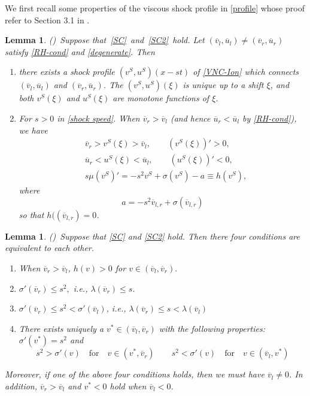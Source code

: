 \documentclass[12pt,reqno]{amsart}
\numberwithin{equation}{section}
\newtheorem{lemma}[theorem]{Lemma}
\begin{document}
We first recall some properties of the viscous shock profile in \eqref{profile} whose proof refer to  Section 3.1 in \cite{InitialModel}.
\begin{lemma}\label{unique}
	(\cite{InitialModel})~Suppose that~\eqref{SC}~and~\eqref{SC2}~hold. Let $(\overline{v}_l,\overline{u}_l)\neq (\overline{v}_r,\overline{u}_r)$ satisfy \eqref{RH-cond} and \eqref{degenerate}. Then
	\begin{enumerate}
		\item[(i)] there exists a shock profile $(v^S,u^S)(x-st)$ of \eqref{VNC-Ion}
		which connects  $(\overline{v}_l,\overline{u}_l)$ and $(\overline{v}_r,\overline{u}_r)$. The $(v^S,u^S)(\xi)$ is unique up to a shift $\xi$, and both
		$v^S(\xi)$ and $u^S(\xi)$ are monotone functions of $\xi$.
		\item[(ii)] For $s>0$ in \eqref{shock speed}. When $\overline{v}_r>\overline{v}_l$ (and hence $\overline{u}_r <  \overline{u}_l$ by \eqref{RH-cond}), we have
		\begin{equation}\label{mono}
			\begin{aligned}
			&\overline{v}_r > v^S(\xi) > \overline{v}_l,\qquad (v^S(\xi))'> 0,\\
			&\overline{u}_r <  u^S(\xi) <  \overline{u}_l,\qquad (u^S(\xi))'<  0,\\
			&s\mu(v^S)'=-s^2v^S+\sigma(v^S)-a\equiv h(v^S),
			\end{aligned}
		\end{equation}
		where
		\begin{equation}
			a=-s^2\overline{v}_{l,r}+\sigma(\overline{v}_{l,r})
		\end{equation}
	so that $h((\overline{v}_{l,r})=0$.
	\end{enumerate}
\end{lemma}
\begin{lemma}\label{4cond}
	(\cite{InitialModel})~Suppose that \eqref{SC} and \eqref{SC2} hold. Then there four conditions are equivalent to each other.
	\begin{enumerate}
		\item [(i)]When $\overline{v}_r > \overline{v}_l$, $h(v) > 0$ for $v \in (\overline{v}_l,\overline{v}_r).$
		\item [(ii)]$\sigma'(\overline{v}_r)\leq s^2,$ i.e., $\lambda(\overline{v}_r)\leq s$.
		\item [(iii)]$\sigma'(\overline{v}_r)\leq s^2<\sigma'(\overline{v}_l)$, i.e., $\lambda(\overline{v}_r)\leq s<\lambda(\overline{v}_l)$
		\item [(iv)]There exists uniquely a $v^* \in (\overline{v}_l,\overline{v}_r)$ with the following properties: $\sigma'(v^*)=s^2$ and 
		\begin{equation}\label{sbm}
			s^2>\sigma'(v) \quad \text{for} \quad v \in (v^*,\overline{v}_r) \qquad s^2<\sigma'(v) \quad \text{for} \quad v \in (\overline{v}_l,v^*)
		\end{equation}
	\end{enumerate}
		Moreover, if one of the above four conditions holds, then we must have $\overline{v}_l \neq 0$. In addition, $\overline{v}_r > \overline{v}_l$
and $v^*< 0$ hold when $\overline{v}_l< 0$.
\end{lemma}
\end{document}

